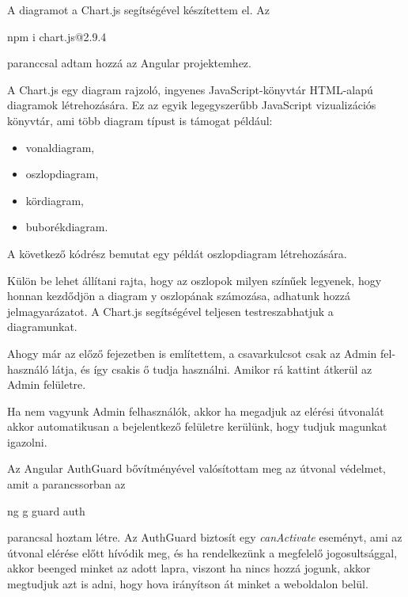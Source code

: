 A diagramot a Chart.js \cite{Chartjs} segítségével készítettem el. Az
\begin{java}
npm i chart.js@2.9.4
\end{java}
paranccsal adtam hozzá az Angular projektemhez.

A Chart.js \cite{Chartjs2} egy diagram rajzoló, ingyenes JavaScript-könyvtár HTML-alapú diagramok létrehozására. Ez az egyik legegyszerűbb JavaScript vizualizációs könyvtár, ami több diagram típust is támogat például:

\begin{itemize}
\item vonaldiagram,
\item oszlopdiagram,
\item kördiagram,
\item buborékdiagram.
\end{itemize}

A következő kódrész bemutat egy példát oszlopdiagram létrehozására.

Külön be lehet állítani rajta, hogy az oszlopok milyen színűek legyenek, hogy honnan kezdődjön a diagram y oszlopának számozása, adhatunk hozzá jelmagyarázatot. A Chart.js segítségével teljesen testreszabhatjuk a diagramunkat.

Ahogy már az előző fejezetben is említettem, a csavarkulcsot csak az Admin fel-
használó látja, és így csakis ő tudja használni. Amikor rá kattint átkerül az Admin felületre.

Ha nem vagyunk Admin felhasználók, akkor ha megadjuk az elérési útvonalát akkor automatikusan a bejelentkező felületre kerülünk, hogy tudjuk magunkat igazolni.

Az Angular AuthGuard \cite{Authguard} bővítményével valósítottam meg az útvonal védelmet, amit a parancssorban az 
\begin{java}
ng g guard auth
\end{java}
parancsal hoztam létre.
Az AuthGuard biztosít egy \textit{canActivate} eseményt, ami az útvonal elérése előtt hívódik meg, és ha rendelkezünk a megfelelő jogosultsággal, akkor beenged minket az adott lapra, viszont ha nincs hozzá jogunk, akkor megtudjuk azt is adni, hogy hova irányítson át minket a weboldalon belül.

